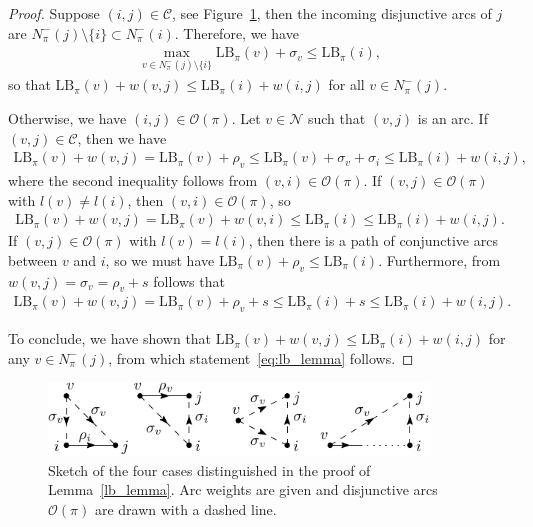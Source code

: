 \documentclass[a4paper]{article}
\theoremstyle{definition}
\theoremstyle{plain}
\begin{document}
\begin{proof}
  Suppose $(i,j) \in \mathcal{C}$, see Figure~\ref{fig:lb_lemma},
  then the incoming disjunctive arcs of $j$ are
  $N^{-}_{\pi}(j) \setminus \{ i \} \subset N^{-}_{\pi}(i)$. Therefore, we have
  \begin{align*}
    \max_{v \in N^{-}_{\pi}(j) \setminus \{i\}} \text{LB}_\pi(v) + \sigma_{v} \leq \text{LB}_\pi(i) ,
  \end{align*}
  so that
      $\text{LB}_\pi(v) + w(v,j) \leq \text{LB}_\pi(i) + w(i,j)$
  for all $v \in N_{\pi}^{-}(j)$.

  Otherwise, we have $(i, j) \in \mathcal{O}(\pi)$.
  Let $v \in \mathcal{N}$ such that $(v, j)$ is an arc.
  If $(v,j) \in \mathcal{C}$, then we have
  \begin{align*}
    \text{LB}_\pi(v) + w(v,j) =
    \text{LB}_\pi(v) + \rho_{v} \leq \text{LB}_\pi(v) + \sigma_{v} + \sigma_{i} \leq \text{LB}_\pi(i) + w(i,j) ,
  \end{align*}
  where the second inequality follows from $(v,i) \in \mathcal{O}(\pi)$.
  If $(v, j) \in \mathcal{O}(\pi)$ with $l(v) \neq l(i)$, then $(v,i) \in \mathcal{O}(\pi)$, so
  \begin{align*}
    \text{LB}_\pi(v) + w(v, j) = \text{LB}_\pi(v) + w(v, i) \leq \text{LB}_\pi(i) \leq \text{LB}_\pi(i) + w(i,j) .
  \end{align*}
  If $(v, j) \in \mathcal{O}(\pi)$ with $l(v) = l(i)$, then there is a path of conjunctive arcs between $v$ and
  $i$, so we must have $\text{LB}_\pi(v) + \rho_{v} \leq \text{LB}_\pi(i)$.
  Furthermore, from $w(v,j) = \sigma_{v} = \rho_{v} + s$ follows that
  \begin{align*}
    \text{LB}_\pi(v) + w(v,j) = \text{LB}_\pi(v) + \rho_{v} + s \leq \text{LB}_\pi(i) + s \leq \text{LB}_\pi(i) + w(i, j) .
  \end{align*}

  To conclude, we have shown that
  $\text{LB}_\pi(v) + w(v,j) \leq \text{LB}_\pi(i) + w(i,j)$ for any
  $v \in N^{-}_{\pi}(j)$, from which statement~\eqref{eq:lb_lemma} follows.
\end{proof}

\begin{figure}
  \centering
  \includegraphics[width=0.9\textwidth]{figures/lower-bound-lemma.pdf}
  \caption{Sketch of the four cases distinguished in the proof of
    Lemma~\ref{lb_lemma}. Arc weights are given and disjunctive arcs
    $\mathcal{O}(\pi)$ are drawn with a dashed line.}\label{fig:lb_lemma}
\end{figure}
\end{document}
